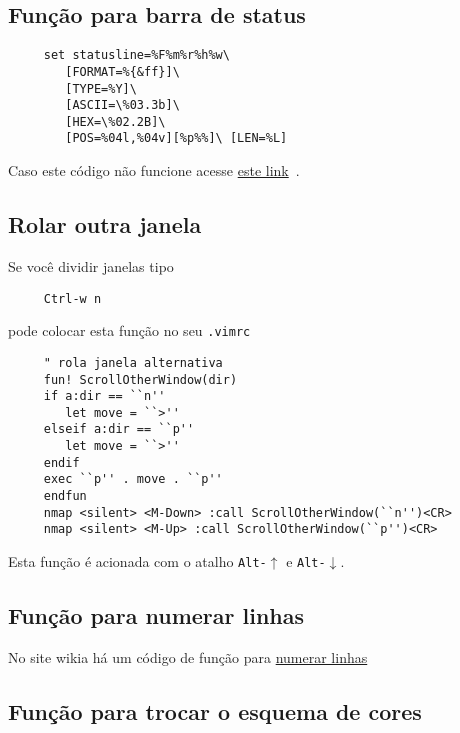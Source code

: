 \subsection{Função para barra de status}\label{Função para barra de status}

\begin{verbatim}
     set statusline=%F%m%r%h%w\
        [FORMAT=%{&ff}]\
        [TYPE=%Y]\
        [ASCII=\%03.3b]\
        [HEX=\%02.2B]\
        [POS=%04l,%04v][%p%%]\ [LEN=%L]
\end{verbatim}

Caso este código não funcione acesse
\href{http://vim.wikia.com/wiki/Writing\_a\_valid\_statusline}{este
link}~\cite{StatusLine}.


\subsection{Rolar outra janela}\label{Rolar outra janela}

Se você dividir janelas tipo

\begin{verbatim}
     Ctrl-w n
\end{verbatim}

pode colocar esta função no seu \verb|.vimrc|

\begin{verbatim}
     " rola janela alternativa
     fun! ScrollOtherWindow(dir)
     if a:dir == ``n''
        let move = ``>''
     elseif a:dir == ``p''
        let move = ``>''
     endif
     exec ``p'' . move . ``p''
     endfun
     nmap <silent> <M-Down> :call ScrollOtherWindow(``n'')<CR>
     nmap <silent> <M-Up> :call ScrollOtherWindow(``p'')<CR>
\end{verbatim}

Esta função é acionada com o atalho {\tt Alt-$\uparrow$} e {\tt Alt-$\downarrow$}.

\subsection{Função para numerar linhas}\label{Função para numerar linhas}

No site wikia há um código de função para
\href{http://vim.wikia.com/wiki/Number\_a\_group\_of\_lines}{numerar
linhas}~\cite{NumerarLinhas}

\subsection{Função para trocar o esquema de cores}

